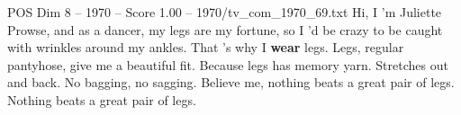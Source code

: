 \begin{textsample}{POS Dim 8 – 1970 – Score 1.00 – 1970/tv\_com\_1970\_69.txt}  \label{ex:f8_pos_089}
Hi, I 'm Juliette Prowse, and as a dancer, my legs are my fortune, so I 'd be crazy to be caught with wrinkles around my ankles.
That 's why I \textbf{wear} legs.
Legs, regular pantyhose, give me a beautiful fit.
Because legs has memory yarn.
Stretches out and back.
No bagging, no sagging.
Believe me, nothing beats a great pair of legs.
Nothing beats a great pair of legs.

\end{textsample}
